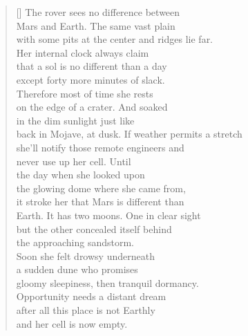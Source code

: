 \documentclass{book}
\begin{document}
\newpage
\renewcommand{\poemtitlefont}{\normalfont\large\itshape\centering}
\setcounter{page}{1}
\settowidth{\versewidth}{back in Mojave, at dusk. If weather permits a stretch}
\begin{verse}[\versewidth]
    The rover sees no difference between\\
    Mars and Earth. The same vast plain\\
    with some pits at the center and ridges lie far. \\
    Her internal clock always claim\\
    that a sol is no different than a day\\
    except forty more minutes of slack.\\
    Therefore most of time she rests\\
    on the edge of a crater. And soaked\\
    in the dim sunlight just like\\
    back in Mojave, at dusk. If weather permits a stretch \\
    she'll notify those remote engineers and\\
    never use up her cell. Until\\
    the day when she looked upon\\
    the glowing dome where she came from,\\
    it stroke her that Mars is different than\\
    Earth. It has two moons. One in clear sight\\
    but the other concealed itself behind\\
    the approaching sandstorm.\\
    Soon she felt drowsy underneath\\
    a sudden dune who promises\\
    gloomy sleepiness, then tranquil dormancy.\\
    Opportunity needs a distant dream\\
    after all this place is not Earthly\\
    and her cell is now empty.\\
\end{verse}

\newpage
\end{document}

